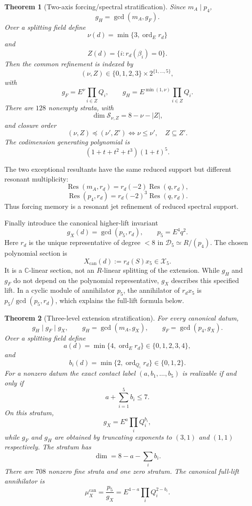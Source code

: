 \documentclass[11pt]{amsart}
\newtheorem{theorem}{Theorem}[section]
\newcommand{\C}{\mathbb C}
\begin{document}
\begin{theorem}[Two-axis forcing/spectral stratification]\label{thm:two-axis}
Since $m_A\mid p_4$,
\[
\boxed{g_H=\gcd(m_A,g_F).}
\]
Over a splitting field define
\[
\nu(d)=\min\{3,\operatorname{ord}_{E}r_d\}
\]
and
\[
Z(d)=\{i:r_d(\beta_i)=0\}.
\]
Then the common refinement is indexed by
\[
(\nu,Z)\in\{0,1,2,3\}\times2^{\{1,\ldots,5\}},
\]
with
\[
\boxed{
g_F=E^\nu\prod_{i\in Z}Q_i,
\qquad
g_H=E^{\min(1,\nu)}\prod_{i\in Z}Q_i.
}
\]
There are $128$ nonempty strata, with
\[
\dim\mathscr S_{\nu,Z}=8-\nu-|Z|,
\]
and closure order
\[
(\nu,Z)\preceq(\nu',Z')
\iff
\nu\le\nu',\quad Z\subseteq Z'.
\]
The codimension generating polynomial is
\[
(1+t+t^2+t^3)(1+t)^5.
\]
\end{theorem}

The two exceptional resultants have the same reduced support but different resonant multiplicity:
\[
\operatorname{Res}(m_A,r_d)=r_d(-2)\operatorname{Res}(q,r_d),
\]
\[
\operatorname{Res}(p_4,r_d)=r_d(-2)^3\operatorname{Res}(q,r_d).
\]
Thus forcing memory is a resonant jet refinement of reduced spectral support.

Finally introduce the canonical higher-lift invariant
\[
g_X(d)=\gcd(p_5,r_d),
\qquad
p_5=E^4q^2.
\]
Here $r_d$ is the unique representative of degree $<8$ in
$\mathscr D_5\simeq R/(p_4)$. The chosen polynomial section is
\[
X_{\mathrm{can}}(d):=r_d(S)x_5\in\mathcal X_5.
\]
It is a $\C$-linear section, not an $R$-linear splitting of the extension.
While $g_H$ and $g_F$ do not depend on the polynomial representative,
$g_X$ describes this specified lift. In a cyclic module of annihilator
$p_5$, the annihilator of $r_dx_5$ is $p_5/\gcd(p_5,r_d)$,
which explains the full-lift formula below.

\begin{theorem}[Three-level extension stratification]\label{thm:three-level}
For every canonical datum,
\[
\boxed{
g_H\mid g_F\mid g_X,
\qquad
g_H=\gcd(m_A,g_X),
\qquad
g_F=\gcd(p_4,g_X).
}
\]
Over a splitting field define
\[
a(d)=\min\{4,\operatorname{ord}_{E}r_d\}\in\{0,1,2,3,4\},
\]
and
\[
b_i(d)=\min\{2,\operatorname{ord}_{Q_i}r_d\}\in\{0,1,2\}.
\]
For a nonzero datum the exact contact label $(a,b_1,\ldots,b_5)$ is realizable if and only if
\[
\boxed{a+\sum_{i=1}^5b_i\le7.}
\]
On this stratum,
\[
\boxed{
g_X=E^a\prod_iQ_i^{b_i},
}
\]
while $g_F$ and $g_H$ are obtained by truncating exponents to $(3,1)$ and $(1,1)$ respectively.  The stratum has
\[
\boxed{
\dim=8-a-\sum_ib_i.
}
\]
There are $708$ nonzero fine strata and one zero stratum.  The canonical full-lift annihilator is
\[
\boxed{
\mu_X^{\mathrm{can}}=\frac{p_5}{g_X}
=E^{4-a}\prod_iQ_i^{2-b_i}.
}
\]
\end{theorem}
\end{document}
